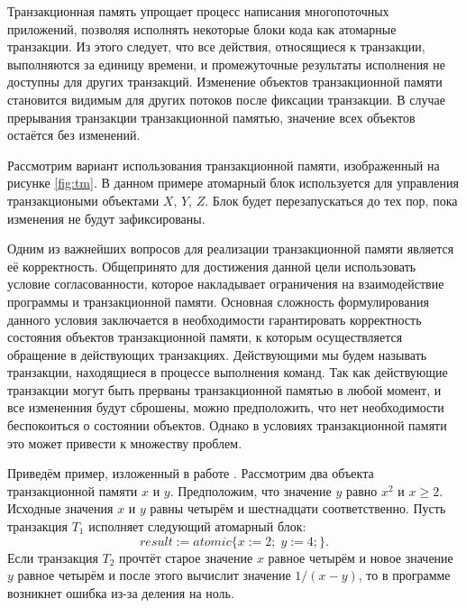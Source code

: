 





\Intro
Транзакционная память упрощает процесс написания многопоточных приложений, позволяя исполнять некоторые блоки кода как атомарные транзакции. Из этого следует, что все действия, относящиеся к транзакции, выполняются за единицу времени, и промежуточные результаты исполнения не доступны для других транзакций. Изменение объектов транзакционной памяти становится видимым для других потоков после фиксации транзакции. В случае прерывания транзакции транзакционной памятью, значение всех объектов остаётся без изменений. 

Рассмотрим вариант использования транзакционной памяти, изображенный на рисунке \ref{fig:tm}. В данном примере атомарный блок используется для управления транзакциоными объектами $X$, $Y$, $Z$. Блок будет перезапускаться до тех пор, пока изменения не будут зафиксированы.

Одним из важнейших вопросов для реализации транзакционной памяти является её корректность. Общепринято для достижения данной цели использовать условие согласованности, которое накладывает ограничения на взаимодействие программы и транзакционной памяти. Основная сложность формулирования данного условия заключается в необходимости гарантировать корректность состояния объектов транзакционной памяти, к которым осуществляется обращение в действующих транзакциях. Действующими мы будем называть транзакции, находящиеся в процессе выполнения команд. Так как действующие транзакции могут быть прерваны транзакционной памятью в любой момент, и все измененния будут сброшены, можно предположить, что нет необходимости беспокоиться о состоянии объектов. Однако в условиях транзакционной памяти это может привести к множеству проблем.

Приведём пример, изложенный в работе \cite{Guerraoui07opacity:a}. Рассмотрим два объекта транзакционной памяти $x$ и $y$. Предположим, что значение $y$ равно $x^2$ и $x \geq 2$. Исходные значения $x$ и $y$ равны четырём и шестнадцати соответственно. Пусть транзакция $T_1$ исполняет следующий атомарный блок: $$ result := atomic \{ x := 2; \; y := 4; \}.$$ Если транзакция $T_2$ прочтёт старое значение $x$ равное четырём и новое значение $y$ равное четырём и после этого вычислит значение $1 / (x - y)$, то в программе возникнет ошибка из-за деления на ноль.

